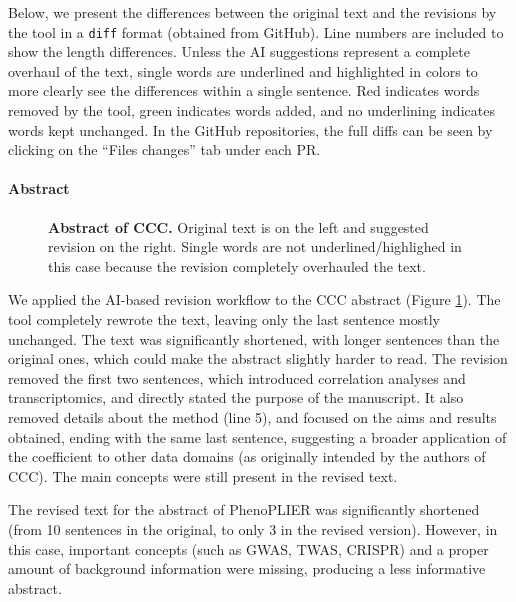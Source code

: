 \documentclass[
]{article}
\begin{document}
Below, we present the differences between the original text and the revisions by the tool in a \texttt{diff} format (obtained from GitHub).
Line numbers are included to show the length differences.
Unless the AI suggestions represent a complete overhaul of the text, single words are underlined and highlighted in colors to more clearly see the differences within a single sentence.
Red indicates words removed by the tool, green indicates words added, and no underlining indicates words kept unchanged.
In the GitHub repositories, the full diffs can be seen by clicking on the ``Files changes'' tab under each PR.

\hypertarget{abstract-1}{%
\paragraph{Abstract}\label{abstract-1}}

\begin{figure}
\hypertarget{fig:abstract:ccc}{%
\centering

\caption{\textbf{Abstract of CCC.}
Original text is on the left and suggested revision on the right.
Single words are not underlined/highlighed in this case because the revision completely overhauled the text.}\label{fig:abstract:ccc}
}
\end{figure}

We applied the AI-based revision workflow to the CCC abstract (Figure \ref{fig:abstract:ccc}).
The tool completely rewrote the text, leaving only the last sentence mostly unchanged.
The text was significantly shortened, with longer sentences than the original ones, which could make the abstract slightly harder to read.
The revision removed the first two sentences, which introduced correlation analyses and transcriptomics, and directly stated the purpose of the manuscript.
It also removed details about the method (line 5), and focused on the aims and results obtained, ending with the same last sentence, suggesting a broader application of the coefficient to other data domains (as originally intended by the authors of CCC).
The main concepts were still present in the revised text.

The revised text for the abstract of PhenoPLIER was significantly shortened (from 10 sentences in the original, to only 3 in the revised version).
However, in this case, important concepts (such as GWAS, TWAS, CRISPR) and a proper amount of background information were missing, producing a less informative abstract.
\end{document}
